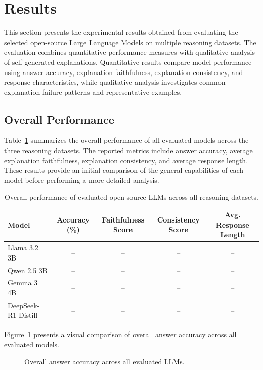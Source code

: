 \documentclass{article}
\begin{document}
\section{Results}

This section presents the experimental results obtained from evaluating the selected open-source Large Language Models on multiple reasoning datasets. The evaluation combines quantitative performance measures with qualitative analysis of self-generated explanations. Quantitative results compare model performance using answer accuracy, explanation faithfulness, explanation consistency, and response characteristics, while qualitative analysis investigates common explanation failure patterns and representative examples.

\subsection{Overall Performance}

Table~\ref{tab:overall} summarizes the overall performance of all evaluated models across the three reasoning datasets. The reported metrics include answer accuracy, average explanation faithfulness, explanation consistency, and average response length. These results provide an initial comparison of the general capabilities of each model before performing a more detailed analysis.

\begin{table}[t]
\centering
\caption{Overall performance of evaluated open-source LLMs across all reasoning datasets.}
\label{tab:overall}
\begin{tabular}{lcccc}
\hline
\textbf{Model} &
\textbf{Accuracy (\%)} &
\textbf{Faithfulness Score} &
\textbf{Consistency Score} &
\textbf{Avg. Response Length} \\
\hline
Llama 3.2 3B & -- & -- & -- & -- \\
Qwen 2.5 3B & -- & -- & -- & -- \\
Gemma 3 4B & -- & -- & -- & -- \\
DeepSeek-R1 Distill & -- & -- & -- & -- \\
\hline
\end{tabular}
\end{table}

Figure~\ref{fig:overall_accuracy} presents a visual comparison of overall answer accuracy across all evaluated models.

\begin{figure}[h]
\centering
{}
\caption{Overall answer accuracy across all evaluated LLMs.}
\label{fig:overall_accuracy}
\end{figure}
\end{document}
